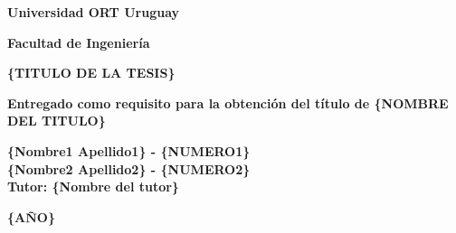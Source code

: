 \vspace*{\fill}

\begin{center}

\begin{Large}
\textbf{Universidad ORT Uruguay}

\textbf{Facultad de Ingeniería}
\bigskip\bigskip\bigskip\bigskip\bigskip\bigskip
\end{Large}

\begin{huge}

\textbf{\{TITULO DE LA TESIS\}}%
\end{huge}    
\bigskip\bigskip\bigskip\bigskip\bigskip\bigskip


\begin{Large}
\textbf{Entregado como requisito para la obtención del título de \{NOMBRE DEL TITULO\}}%
\end{Large}
\bigskip\bigskip\bigskip\bigskip\bigskip\bigskip\bigskip\bigskip

\begin{Large}
\textbf{\{Nombre1 Apellido1\} - \{NUMERO1\}} \\%
\textbf{\{Nombre2 Apellido2\} - \{NUMERO2\}} \\%
\bigskip
\bigskip
\bigskip
\textbf{Tutor: \{Nombre del tutor\}}%

\bigskip\bigskip\bigskip\bigskip
\end{Large}

\begin{huge}
\textbf{\{AÑO\}}%
\end{huge}

\end{center}
\vspace*{\fill}